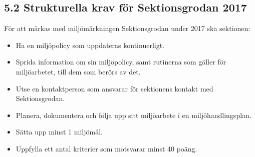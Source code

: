 \documentclass[../_main/handlingar.tex]{subfiles}
\begin{document}
\subsection*{5.2 Strukturella krav för Sektionsgrodan 2017}
För att märkas med miljömärkningen Sektionsgrodan under 2017 ska sektionen:

\begin{itemize}
    \item Ha en miljöpolicy som uppdateras kontinuerligt.
    \item Sprida information om sin miljöpolicy, samt rutinerna som gäller för miljöarbetet, till dem som berörs av det.
    \item Utse en kontaktperson som ansvarar för sektionens kontakt med Sektionsgrodan.
    \item Planera, dokumentera och följa upp sitt miljöarbete i en miljöhandlingsplan.
    \item Sätta upp minst 1 miljömål.
    \item Uppfylla ett antal kriterier som motsvarar minst 40 poäng.    
\end{itemize}
\end{document}
